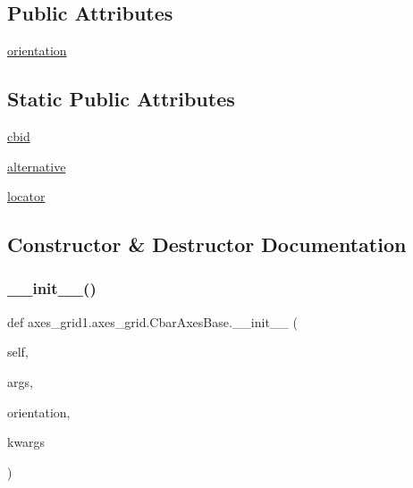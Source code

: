 \subsection*{Public Attributes}
\begin{DoxyCompactItemize}
\item 
\hyperlink{classaxes__grid1_1_1axes__grid_1_1CbarAxesBase_a3d11bd8175ae29cce5a045478cb94567}{orientation}
\end{DoxyCompactItemize}
\subsection*{Static Public Attributes}
\begin{DoxyCompactItemize}
\item 
\hyperlink{classaxes__grid1_1_1axes__grid_1_1CbarAxesBase_a2e286b1958f5c6ed84815bded0e038e6}{cbid}
\item 
\hyperlink{classaxes__grid1_1_1axes__grid_1_1CbarAxesBase_a8d0488f46e921e9d45ff76e83d3ba10c}{alternative}
\item 
\hyperlink{classaxes__grid1_1_1axes__grid_1_1CbarAxesBase_a3e931ec893bfdee99696f99bbbb72e0c}{locator}
\end{DoxyCompactItemize}


\subsection{Constructor \& Destructor Documentation}
\mbox{\label{classaxes__grid1_1_1axes__grid_1_1CbarAxesBase_a4c21fc42794765e22ca9bb6aadb9c502}} 
\subsubsection{\texorpdfstring{\+\_\+\+\_\+init\+\_\+\+\_\+()}{\_\_init\_\_()}}
{\footnotesize\ttfamily def axes\+\_\+grid1.\+axes\+\_\+grid.\+Cbar\+Axes\+Base.\+\_\+\+\_\+init\+\_\+\+\_\+ (\begin{DoxyParamCaption}\item[{}]{self,  }\item[{}]{args,  }\item[{}]{orientation,  }\item[{}]{kwargs }\end{DoxyParamCaption})}



